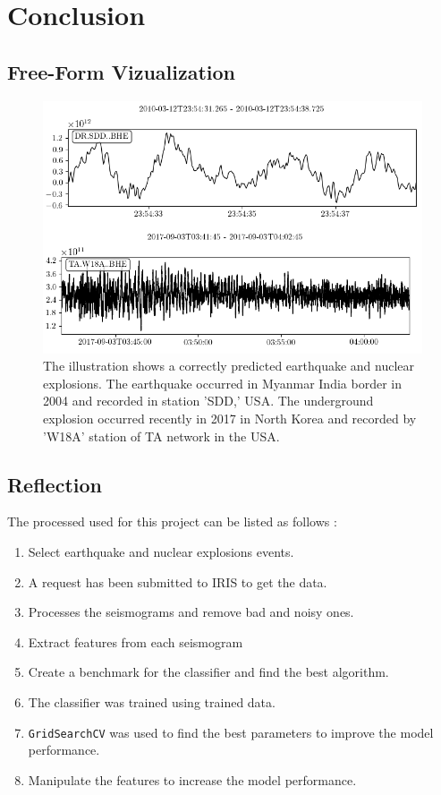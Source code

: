 \documentclass[12pt]{article}
\begin{document}
        \section{Conclusion}
        \subsection{Free-Form Vizualization}

        \begin{figure}[H]
            \begin{center}
            \includegraphics[scale=0.5]{figures/predicted_seismogram.png}
            \end{center}
            \caption{The illustration shows a correctly predicted earthquake and nuclear explosions. The earthquake occurred in Myanmar India border in 2004 and recorded in station 'SDD,' USA. The underground explosion occurred recently in 2017 in North Korea and recorded by 'W18A' station of TA network in the USA.}
            \label{fig:predicted_seismogram}
        \end{figure}

        \subsection{Reflection}
        The processed used for this project can be listed as follows :
        \begin{enumerate}
            \item Select earthquake and nuclear explosions events.
            \item A request has been submitted to IRIS to get the data.
            \item Processes the seismograms and remove bad and noisy ones.
            \item Extract features from each seismogram
            \item Create a benchmark for the classifier and find the best algorithm.
            \item The classifier was trained using trained data.
            \item \texttt{GridSearchCV} was used to find the best parameters to improve the model performance.
            \item Manipulate the features to increase the model performance. 
        \end{enumerate}
    
\end{document}
